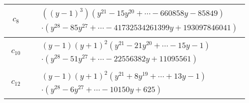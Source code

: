 \documentclass[1p]{elsarticle_modified}
\theoremstyle{definition}
\begin{document}
\begin{tabular}{m{50pt}|m{274pt}}
\hline $$\begin{aligned}c_{8}\end{aligned}$$&$\begin{aligned}
&((y-1)^3)(y^{21}-15 y^{20}+\cdots-660858 y-85849)\\
&\cdot(y^{28}-85 y^{27}+\cdots-41732534261399 y+193097846041)
\end{aligned}$\\
\hline $$\begin{aligned}c_{10}\end{aligned}$$&$\begin{aligned}
&(y-1)(y+1)^2(y^{21}-21 y^{20}+\cdots-15 y-1)\\
&\cdot(y^{28}-51 y^{27}+\cdots-22556382 y+11095561)
\end{aligned}$\\
\hline $$\begin{aligned}c_{12}\end{aligned}$$&$\begin{aligned}
&(y-1)(y+1)^2(y^{21}+8 y^{19}+\cdots+13 y-1)\\
&\cdot(y^{28}-6 y^{27}+\cdots-10150 y+625)
\end{aligned}$\\
\hline
\end{tabular}
\vskip 2pc
\end{document}
